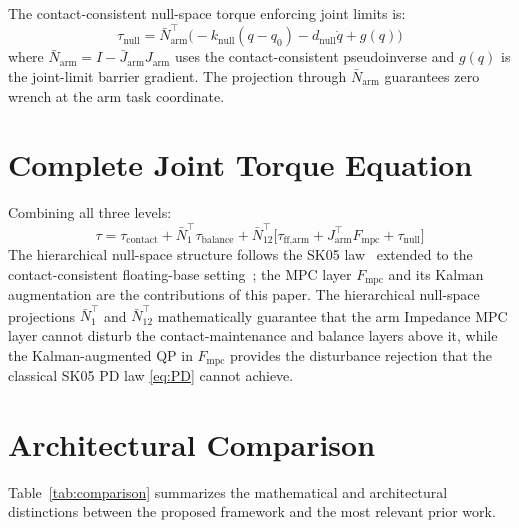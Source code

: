 \documentclass[journal]{IEEEtran}
\newcommand{\Fmpc}{F_{\text{mpc}}}
\newcommand{\Naug}{\bar{N}_{12}}
\begin{document}
The contact-consistent null-space torque enforcing joint limits is:
\begin{equation}\label{eq:null}
  \tau_{\text{null}}
    = \bar{N}_{\text{arm}}^\top\bigl(-k_{\text{null}}(q-q_0)
      -d_{\text{null}}\dot{q}+g(q)\bigr)
\end{equation}
where $\bar{N}_{\text{arm}}=I-\bar{J}_{\text{arm}}J_{\text{arm}}$ uses the
contact-consistent pseudoinverse and $g(q)$ is the joint-limit barrier
gradient.
The projection through $\bar{N}_{\text{arm}}$ guarantees zero wrench at the
arm task coordinate.

\section{Complete Joint Torque Equation}\label{sec:torque}

Combining all three levels:
\begin{equation}\label{eq:fulltorque}
  \tau = \tau_{\text{contact}}
       + \bar{N}_1^\top\tau_{\text{balance}}
       + \Naug^\top\bigl[\tau_{\text{ff,arm}}
         + J_{\text{arm}}^\top\Fmpc + \tau_{\text{null}}\bigr]
\end{equation}
The hierarchical null-space structure follows the SK05
law~\cite{sentis2005synthesis} extended to the contact-consistent
floating-base setting~\cite{khatib1987unified,righetti2011inverse}; the MPC
layer $\Fmpc$ and its Kalman augmentation are the contributions of this
paper. The hierarchical null-space projections $\bar{N}_1^\top$ and
$\Naug^\top$ mathematically guarantee that the arm Impedance MPC layer
cannot disturb the contact-maintenance and balance layers above it, while
the Kalman-augmented QP in $\Fmpc$ provides the disturbance rejection that
the classical SK05 PD law \eqref{eq:PD} cannot achieve.

\section{Architectural Comparison}\label{sec:comparison}

Table~\ref{tab:comparison} summarizes the mathematical and architectural
distinctions between the proposed framework and the most relevant prior
work.
\end{document}
